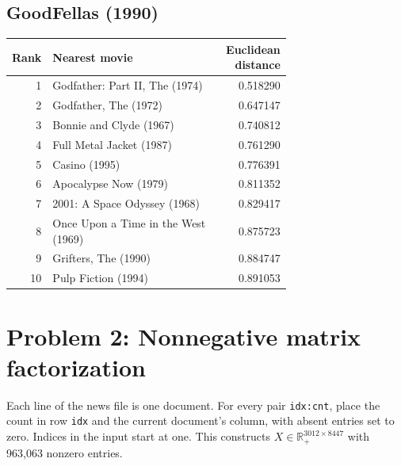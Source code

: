 \documentclass[10pt]{article}
\begin{document}
\subsection*{GoodFellas (1990)}
\begin{center}\small\renewcommand{\arraystretch}{0.96}
\begin{tabular}{r p{0.70\linewidth} r}\toprule
Rank & Nearest movie & Euclidean distance\\\midrule
1 & Godfather: Part II, The (1974) & 0.518290 \\
2 & Godfather, The (1972) & 0.647147 \\
3 & Bonnie and Clyde (1967) & 0.740812 \\
4 & Full Metal Jacket (1987) & 0.761290 \\
5 & Casino (1995) & 0.776391 \\
6 & Apocalypse Now (1979) & 0.811352 \\
7 & 2001: A Space Odyssey (1968) & 0.829417 \\
8 & Once Upon a Time in the West (1969) & 0.875723 \\
9 & Grifters, The (1990) & 0.884747 \\
10 & Pulp Fiction (1994) & 0.891053 \\
\bottomrule\end{tabular}\end{center}

\clearpage
\section*{Problem 2: Nonnegative matrix factorization}
Each line of the news file is one document. For every pair \texttt{idx:cnt}, place
the count in row \texttt{idx} and the current document's column, with absent
entries set to zero. Indices in the input start at one. This constructs
$X\in\mathbb R_+^{3012\times8447}$ with 963,063 nonzero entries.
\end{document}
